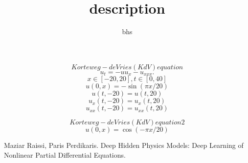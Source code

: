 \documentclass[12pt]{amsart}
\title{description}
\author{bhs}
\begin{document}
\maketitle

$$Korteweg-de Vries (KdV) equation$$
$$ u_t = - u u_x - u_{xxx}. $$
$$x\in [-20,20] ,t \in [0,40]$$
$$u(0,x) = -\sin(\pi x/20)$$
$$u(t,-20) = u(t,20)$$
$$u_x(t,-20) = u_x(t,20)$$
$$u_{xx}(t,-20) = u_{xx}(t,20)$$

$$Korteweg-de Vries (KdV) equation 2$$
$$u(0,x) = \cos(-\pi x/20)$$

\begin{thebibliography}{10}
 Maziar Raissi, Paris Perdikaris. Deep Hidden Physics Models: Deep Learning of Nonlinear Partial Differential Equations.
\end{thebibliography}
\end{document}
